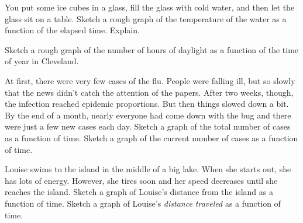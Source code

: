 \documentclass{ximera}
\begin{document}
\begin{question} 
You put some ice cubes in a glass, fill the glass with cold water, and then let the glass sit on a table.  Sketch a rough graph of the temperature of the water as a function of the elapsed time.  Explain.
\end{question}
\begin{question}
Sketch a rough graph of the number of hours of daylight as a function of the time of year in Cleveland.
\end{question}	
\begin{question} 
At first, there were very few cases of the flu.  People were falling ill, but so slowly that the news didn't catch the attention of the papers.  After two weeks, though, the infection reached epidemic proportions.  But then things slowed down a bit.  By the end of a month, nearly everyone had come down with the bug and there were just a few new cases each day.  Sketch a graph of the total number of cases as a function of time.  Sketch a graph of the current number of cases as a function of time.
\end{question}
\begin{question} 
Louise swims to the island in the middle of a big lake.  When she starts out, she has lots of energy.  However, she tires soon and her speed decreases until she reaches the island.  Sketch a graph of Louise's distance from the island as a function of time.  Sketch a graph of Louise's {\em distance traveled} as a function of time.
\end{question}
\end{document}
